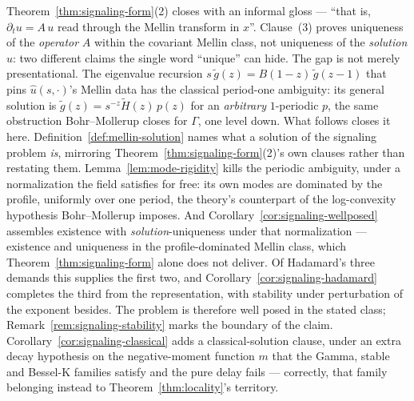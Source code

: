 Theorem~\ref{thm:signaling-form}(2) closes with an informal gloss --- ``that is,
$\partial_t u = A\,u$ read through the Mellin transform in $x$''. Clause~(3) proves
uniqueness of the \emph{operator} $A$ within the covariant Mellin class, not uniqueness of the
\emph{solution} $u$: two different claims the single word ``unique'' can hide. The gap is not
merely presentational. The eigenvalue recursion $s\,\tilde g(z) = B(1-z)\,\tilde g(z-1)$ that
pins $\hat u(s,\cdot)$'s Mellin data has the classical period-one ambiguity: its general
solution is $\tilde g(z) = s^{-z}\tilde H(z)\,p(z)$ for an \emph{arbitrary} $1$-periodic $p$,
the same obstruction Bohr--Mollerup closes for $\Gamma$, one level down. What follows closes it
here. Definition~\ref{def:mellin-solution} names what a solution of the signaling problem
\emph{is}, mirroring Theorem~\ref{thm:signaling-form}(2)'s own clauses rather than restating
them. Lemma~\ref{lem:mode-rigidity} kills the periodic ambiguity, under a normalization the
field satisfies for free: its own modes are dominated by the profile, uniformly over one
period, the theory's counterpart of the log-convexity hypothesis Bohr--Mollerup imposes. And
Corollary~\ref{cor:signaling-wellposed} assembles existence with \emph{solution}-uniqueness
under that normalization --- existence and uniqueness in the profile-dominated Mellin
class, which Theorem~\ref{thm:signaling-form} alone does not deliver. Of Hadamard's three
demands this supplies the first two, and Corollary~\ref{cor:signaling-hadamard} completes
the third from the representation, with stability under perturbation of the exponent
besides. The problem is therefore well posed in the stated class;
Remark~\ref{rem:signaling-stability} marks the boundary of the claim.
Corollary~\ref{cor:signaling-classical} adds a classical-solution clause, under an extra
decay hypothesis on the negative-moment function $m$ that the Gamma, stable and Bessel-K
families satisfy and the pure delay fails --- correctly, that family belonging instead to
Theorem~\ref{thm:locality}'s territory.

